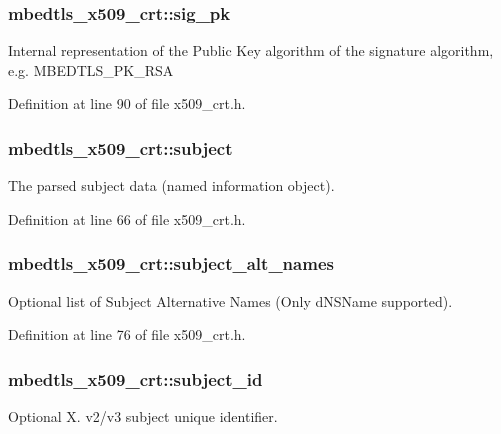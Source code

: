 \hypertarget{structmbedtls__x509__crt_a65d5d20352a08c77e173808fde1f8660}{
\subsubsection[{sig\-\_\-pk}]{ mbedtls\-\_\-x509\-\_\-crt\-::sig\-\_\-pk}}\label{structmbedtls__x509__crt_a65d5d20352a08c77e173808fde1f8660}
Internal representation of the Public Key algorithm of the signature algorithm, e.\-g. M\-B\-E\-D\-T\-L\-S\-\_\-\-P\-K\-\_\-\-R\-S\-A 

Definition at line 90 of file x509\-\_\-crt.\-h.

\hypertarget{structmbedtls__x509__crt_a773e92423092ab65e5e50031bd9663a5}{
\subsubsection[{subject}]{ mbedtls\-\_\-x509\-\_\-crt\-::subject}}\label{structmbedtls__x509__crt_a773e92423092ab65e5e50031bd9663a5}
The parsed subject data (named information object). 

Definition at line 66 of file x509\-\_\-crt.\-h.

\hypertarget{structmbedtls__x509__crt_a1f148e8fb52e03e2604e716386a07df4}{
\subsubsection[{subject\-\_\-alt\-\_\-names}]{ mbedtls\-\_\-x509\-\_\-crt\-::subject\-\_\-alt\-\_\-names}}\label{structmbedtls__x509__crt_a1f148e8fb52e03e2604e716386a07df4}
Optional list of Subject Alternative Names (Only d\-N\-S\-Name supported). 

Definition at line 76 of file x509\-\_\-crt.\-h.

\hypertarget{structmbedtls__x509__crt_adbbaba207a103a73f41b4b72ffc540f5}{
\subsubsection[{subject\-\_\-id}]{ mbedtls\-\_\-x509\-\_\-crt\-::subject\-\_\-id}}\label{structmbedtls__x509__crt_adbbaba207a103a73f41b4b72ffc540f5}
Optional X. v2/v3 subject unique identifier. 

